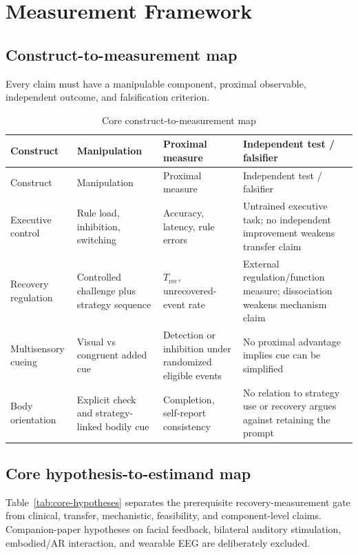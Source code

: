 \section{Measurement Framework}

\subsection{Construct-to-measurement map}

Every claim must have a manipulable component, proximal observable, independent outcome, and falsification criterion.

\begingroup
\small
\setlength{\LTpre}{6pt}
\setlength{\LTpost}{6pt}
\renewcommand{\arraystretch}{1.1}
\begin{longtable}{p{2.7cm}p{3.2cm}p{3.2cm}p{3.2cm}}
\caption{Core construct-to-measurement map}\\
\toprule
Construct & Manipulation & Proximal measure & Independent test / falsifier \\

\midrule
\endfirsthead
\toprule
Construct & Manipulation & Proximal measure & Independent test / falsifier \\

\midrule
\endhead
\midrule
\endfoot
\bottomrule
\endlastfoot
Executive control & Rule load, inhibition, switching & Accuracy, latency, rule errors & Untrained executive task; no independent improvement weakens transfer claim \\
Recovery regulation & Controlled challenge plus strategy sequence & \(T_{\mathrm{rec}}\), unrecovered-event rate & External regulation/\allowbreak function measure; dissociation weakens mechanism claim \\
Multisensory cueing & Visual vs congruent added cue & Detection or inhibition under randomized eligible events & No proximal advantage implies cue can be simplified \\
Body orientation & Explicit check and strategy-linked bodily cue & Completion, self-report consistency & No relation to strategy use or recovery argues against retaining the prompt \\
\end{longtable}
\endgroup

\subsection{Core hypothesis-to-estimand map}

Table~\ref{tab:core-hypotheses} separates the prerequisite recovery-measurement gate from clinical, transfer, mechanistic, feasibility, and component-level claims. Companion-paper hypotheses on facial feedback, bilateral auditory stimulation, embodied/AR interaction, and wearable EEG are deliberately excluded.

